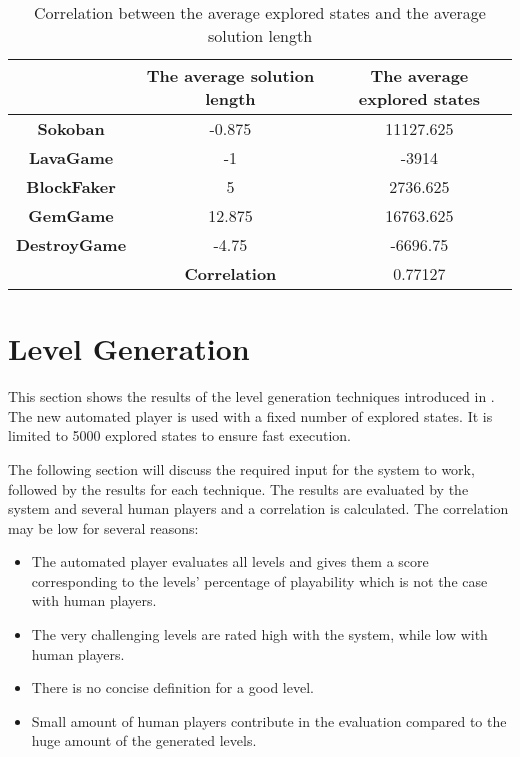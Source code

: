 \begin{table}[!ht]
	\centering
	\begin{tabular}{|c|c|c|}
		\hline
		 & \textbf{The average solution length} & \textbf{The average explored states}\\
		\hline
		\textbf{Sokoban} & -0.875 & 11127.625\\
		\hline
		\textbf{LavaGame} & -1 & -3914\\
		\hline
		\textbf{BlockFaker} & 5 & 2736.625\\
		\hline
		\textbf{GemGame} & 12.875 & 16763.625\\
		\hline
		\textbf{DestroyGame} & -4.75 & -6696.75\\
		\hline
		 & \textbf{Correlation} & 0.77127\\
		\hline
	\end{tabular}
	\caption{Correlation between the average explored states and the average solution length}
	\label{Table:playerCorrelation}
\end{table}

\section{Level Generation}
This section shows the results of the level generation techniques introduced in . The new automated player is used with a fixed number of explored states. It is limited to 5000 explored states to ensure fast execution.\\\par

The following section will discuss the required input for the system to work, followed by the results for each technique. The results are evaluated by the system and several human players and a correlation is calculated. The correlation may be low for several reasons:
\begin{itemize} \itemsep0pt \parskip0pt 
	\item The automated player evaluates all levels and gives them a score corresponding to the levels' percentage of playability which is not the case with human players. 
	\item The very challenging levels are rated high with the system, while low with human players.
	\item There is no concise definition for a good level.
	\item Small amount of human players contribute in the evaluation compared to the huge amount of the generated levels.
\end{itemize}

